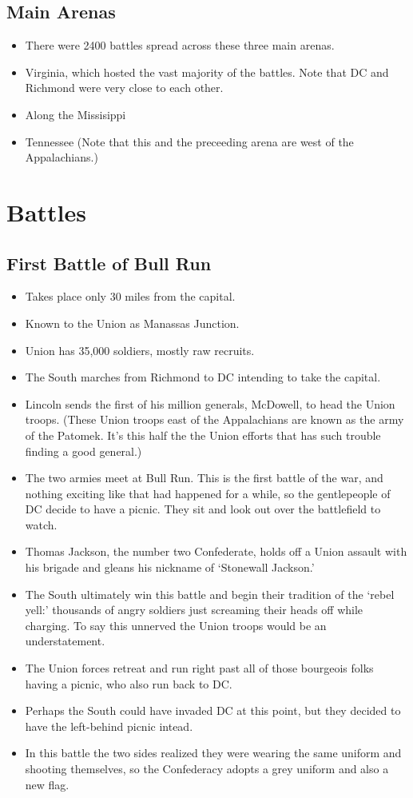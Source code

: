 \documentclass{article}
\begin{document}
  \subsection{Main Arenas}
    \begin{itemize}
      \item There were 2400 battles spread across these three main arenas.
      \item Virginia, which hosted the vast majority of the battles. Note that DC and Richmond were very close to each other.
      \item Along the Missisippi
      \item Tennessee (Note that this and the preceeding arena are west of the Appalachians.)
    \end{itemize}

\section{Battles}
  \subsection{First Battle of Bull Run}
    \begin{itemize}
      \item Takes place only 30 miles from the capital.
      \item Known to the Union as Manassas Junction.
      \item Union has 35,000 soldiers, mostly raw recruits.
      \item The South marches from Richmond to DC intending to take the capital.
      \item Lincoln sends the first of his million generals, McDowell, to head the Union troops. (These Union troops east of the Appalachians are known as the army of the Patomek. It's this half the the Union efforts that has such trouble finding a good general.)
      \item The two armies meet at Bull Run. This is the first battle of the war, and nothing exciting like that had happened for a while, so the gentlepeople of DC decide to have a picnic. They sit and look out over the battlefield to watch.
      \item Thomas Jackson, the number two Confederate, holds off a Union assault with his brigade and gleans his nickname of `Stonewall Jackson.'
      \item The South ultimately win this battle and begin their tradition of the `rebel yell:' thousands of angry soldiers just screaming their heads off while charging. To say this unnerved the Union troops would be an understatement.
      \item The Union forces retreat and run right past all of those bourgeois folks having a picnic, who also run back to DC.
      \item Perhaps the South could have invaded DC at this point, but they decided to have the left-behind picnic intead.
      \item In this battle the two sides realized they were wearing the same uniform and shooting themselves, so the Confederacy adopts a grey uniform and also a new flag.
    \end{itemize}
\end{document}
